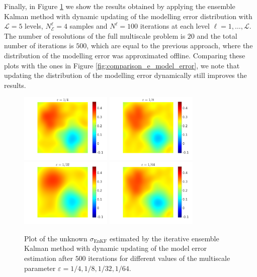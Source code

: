 \documentclass[10pt]{article}
\begin{document}
Finally, in Figure \ref{fig:comparison_e_model_error_levels} we show the results obtained by applying the ensemble Kalman method with dynamic updating of the modelling error distribution with $\mathcal{L} = 5$ levels, $N_{\mathcal{E}}^{\ell} = 4$ samples and $N^{\ell} = 100$ iterations at each level $\ell = 1, \dots, \mathcal{L}$. The number of resolutions of the full multiscale problem is $20$ and the total number of iterations is $500$, which are equal to the previous approach, where the distribution of the modelling error was approximated offline. Comparing these plots with the ones in Figure \ref{fig:comparison_e_model_error}, we note that updating the distribution of the modelling error dynamically still improves the results.

\begin{figure}[t]
\centering
\includegraphics[width = 0.39\textwidth]{ensemble_500_e4_model_error_Levels}
\includegraphics[width = 0.39\textwidth]{ensemble_500_e8_model_error_Levels}
\\
\includegraphics[width = 0.39\textwidth]{ensemble_500_e32_model_error_Levels}
\includegraphics[width = 0.39\textwidth]{ensemble_500_e64_model_error_Levels}
\caption{Plot of the unknown $\sigma_{\mathrm{EnKF}}$ estimated by the iterative ensemble Kalman method with dynamic updating of the model error estimation after $500$ iterations for different values of the multiscale parameter $\varepsilon = 1/4, 1/8, 1/32, 1/64$.}
\label{fig:comparison_e_model_error_levels}
\end{figure}
\end{document}
